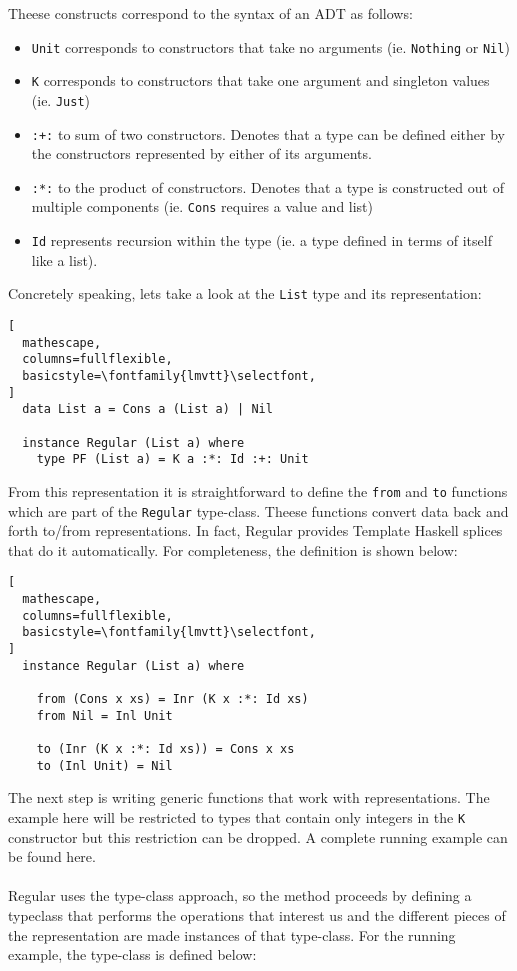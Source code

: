 \documentclass[8pt]{extarticle}
\begin{document}
Theese constructs correspond to the syntax of an ADT as follows:
\begin{itemize}
\item \verb+Unit+ corresponds to constructors that take no arguments (ie. \verb+Nothing+ or \verb+Nil+)
\item \verb+K+ corresponds to constructors that take one argument and singleton values (ie. \verb+Just+)
\item \verb-:+:- to sum of two constructors. Denotes that a type can be defined either by the constructors represented by either of its arguments.
\item \verb+:*:+ to the product of constructors. Denotes that a type is constructed out of multiple components (ie. \verb+Cons+ requires a value and list)
\item \verb+Id+ represents recursion within the type (ie. a type defined in terms of itself like a list).
\end{itemize}
Concretely speaking, lets take a look at the \verb+List+ type and its representation:
\begin{lstlisting}[
  mathescape,
  columns=fullflexible,
  basicstyle=\fontfamily{lmvtt}\selectfont,
]
  data List a = Cons a (List a) | Nil

  instance Regular (List a) where
    type PF (List a) = K a :*: Id :+: Unit
\end{lstlisting}
From this representation it is straightforward to define the \verb+from+ and \verb+to+ functions which are part of the \verb+Regular+ type-class. Theese functions convert data back and forth to/from representations. In fact, Regular provides Template Haskell splices that do it automatically. For completeness, the definition is shown below:
\begin{lstlisting}[
  mathescape,
  columns=fullflexible,
  basicstyle=\fontfamily{lmvtt}\selectfont,
]
  instance Regular (List a) where

    from (Cons x xs) = Inr (K x :*: Id xs)
    from Nil = Inl Unit
    
    to (Inr (K x :*: Id xs)) = Cons x xs
    to (Inl Unit) = Nil
\end{lstlisting}
The next step is writing generic functions that work with representations. The example here will be restricted to types that contain only integers in the \verb+K+ constructor but this restriction can be dropped. A complete running example can be found here\cite{RegularGit}.
\\\\
Regular uses the type-class approach, so the method proceeds by defining a typeclass that performs the operations that interest us and the different pieces of the representation are made instances of that type-class. For the running example, the type-class is defined below:
\end{document}
